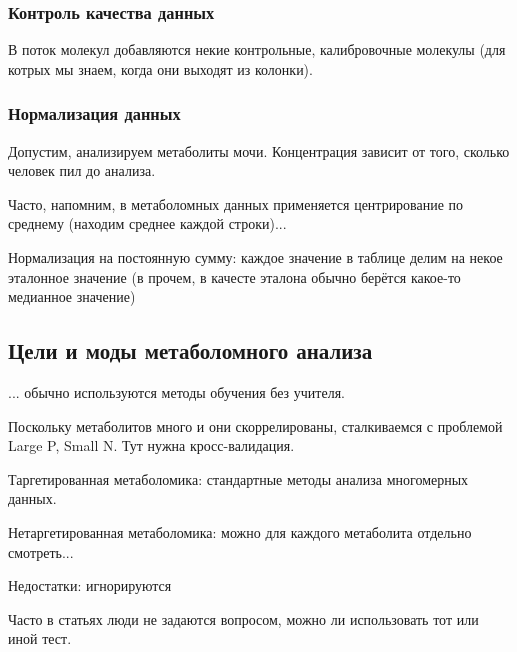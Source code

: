\documentclass[main.tex]{subfiles}
\begin{document}
\subsubsection{Контроль качества данных}

В поток молекул добавляются некие контрольные, калибровочные молекулы (для котрых мы знаем, когда они выходят из колонки).

\subsubsection{Нормализация данных}

Допустим, анализируем метаболиты мочи.
Концентрация зависит от того, сколько человек пил до анализа.

Часто, напомним, в метаболомных данных применяется центрирование по среднему (находим среднее каждой строки)...

Нормализация на постоянную сумму: каждое значение в таблице делим на некое эталонное значение (в прочем, в качесте эталона обычно берётся какое-то медианное значение)


\subsection{Цели и моды метаболомного анализа}

... обычно используются методы обучения без учителя.

Поскольку метаболитов много и они скоррелированы, сталкиваемся с проблемой Large P, Small N.
Тут нужна кросс-валидация.

Таргетированная метаболомика: стандартные методы анализа многомерных данных.

Нетаргетированная метаболомика: можно для каждого метаболита отдельно смотреть...

Недостатки: игнорируются

Часто в статьях люди не задаются вопросом, можно ли использовать тот или иной тест.
\end{document}
